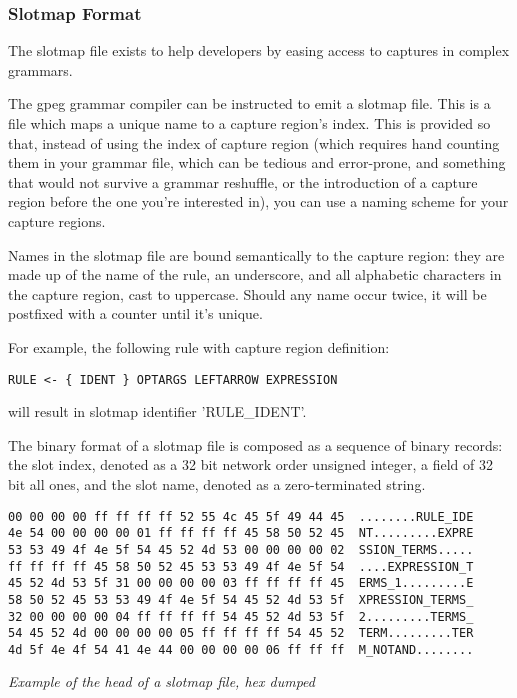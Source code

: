 \subsubsection{Slotmap Format}

The slotmap file exists to help developers by easing access to
captures in complex grammars.

The gpeg grammar compiler can be instructed to emit a slotmap file.
This is a file which maps a unique name to a capture region's index.
This is provided so that, instead of using the index of capture region
(which requires hand counting them in your grammar file, which can be
tedious and error-prone, and something that would not survive
a grammar reshuffle, or the introduction of a capture region before
the one you're interested in), you can use a naming scheme for your
capture regions.

Names in the slotmap file are bound semantically to the capture region:
they are made up of the name of the rule,
an underscore, and all alphabetic characters in the capture region,
cast to uppercase. Should any name occur twice, it will be postfixed with
a counter until it's unique.

For example, the following rule with capture region definition:

\begin{myquote}
\begin{verbatim}
RULE <- { IDENT } OPTARGS LEFTARROW EXPRESSION
\end{verbatim}
\end{myquote}

will result in slotmap identifier 'RULE\_IDENT'.

The binary format of a slotmap file is composed as a sequence of binary records:
the slot index, denoted as a 32 bit network order unsigned integer, a
field of 32 bit all ones, and the slot name, denoted as a zero-terminated
string.

\begin{myquote}
\begin{verbatim}
00 00 00 00 ff ff ff ff 52 55 4c 45 5f 49 44 45  ........RULE_IDE
4e 54 00 00 00 00 01 ff ff ff ff 45 58 50 52 45  NT.........EXPRE
53 53 49 4f 4e 5f 54 45 52 4d 53 00 00 00 00 02  SSION_TERMS.....
ff ff ff ff 45 58 50 52 45 53 53 49 4f 4e 5f 54  ....EXPRESSION_T
45 52 4d 53 5f 31 00 00 00 00 03 ff ff ff ff 45  ERMS_1.........E
58 50 52 45 53 53 49 4f 4e 5f 54 45 52 4d 53 5f  XPRESSION_TERMS_
32 00 00 00 00 04 ff ff ff ff 54 45 52 4d 53 5f  2.........TERMS_
54 45 52 4d 00 00 00 00 05 ff ff ff ff 54 45 52  TERM.........TER
4d 5f 4e 4f 54 41 4e 44 00 00 00 00 06 ff ff ff  M_NOTAND........
\end{verbatim}
\end{myquote}
\textit{Example of the head of a slotmap file, hex dumped}

